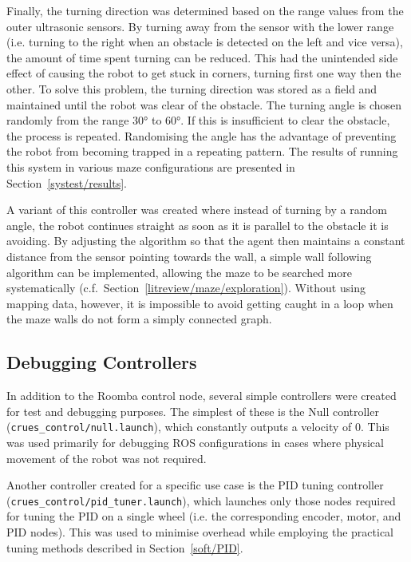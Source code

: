 Finally, the turning direction was determined based on the range values from
the outer ultrasonic sensors. By turning away from the sensor with the lower
range (i.e. turning to the right when an obstacle is detected on the left and
vice versa), the amount of time spent turning can be reduced. This had the
unintended side effect of causing the robot to get stuck
in corners, turning first one way then the other. To solve this problem, the
turning direction was stored as a field and maintained until the robot was clear
of the obstacle. The turning angle is chosen randomly from the range \ang{30}
to \ang{60}. If this is insufficient to clear the obstacle, the process is
repeated. Randomising the angle has the advantage of preventing the robot from
becoming trapped in a repeating pattern. The results of running this system in
various maze configurations are presented in Section~\ref{systest/results}.

A variant of this controller was created where instead of turning by a random
angle, the robot continues straight as soon as it is parallel to the obstacle
it is avoiding. By adjusting the algorithm so that the agent then
maintains a constant distance from the sensor pointing towards the wall, a
simple wall following algorithm can be implemented, allowing the maze to be
searched more systematically (c.f.\ Section~\ref{litreview/maze/exploration}).
Without using mapping data, however, it is impossible to avoid getting caught
in a loop when the maze walls do not form a simply connected graph.


\subsection{Debugging Controllers}\label{soft/control/debug}

In addition to the Roomba control node, several simple controllers were created
for test and debugging purposes. The simplest of these is the Null controller
(\verb|crues_control/null.launch|), which constantly outputs a velocity of 0.
This was used primarily for debugging ROS configurations in cases where
physical movement of the robot was not required.

Another controller created for a specific use case is the PID tuning controller
(\verb|crues_control/pid_tuner.launch|), which launches only those nodes
required for tuning the PID on a single wheel (i.e. the corresponding encoder,
motor, and PID nodes). This was used to minimise overhead while employing the
practical tuning methods described in Section~\ref{soft/PID}.

